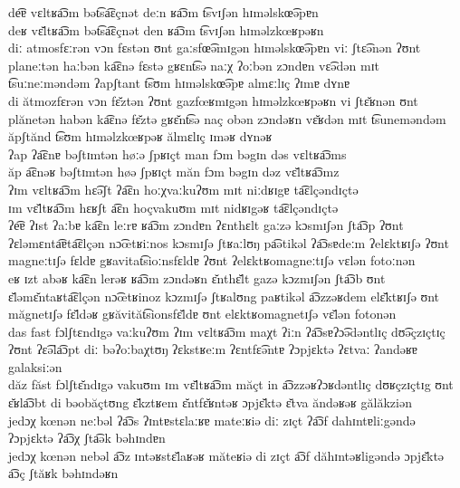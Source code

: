 \begin{exe}
  \ex \gll de͡ɐ vɛltʁa͡ɔm bət͡sa͡ɛçnət deːn ʁa͡ɔm t͡svɪʃən hɪməlskœ͡əpɐn\\
  deʁ vɛ̆ltʁa͡ɔm bət͡sa͡ɛçnət den ʁa͡ɔm t͡svɪʃən hɪməlzkœʁpəʁn\\
  \ex \gll diː atmosfɛːrən vɔn fɛstən ʊnt gaːsfœ͡əmɪgən hɪməlskœ͡əpɐn viː ʃtɛ͡ənən ʔʊnt planeːtən haːbən ka͡ɛnə fɛstə gʁɛnt͡sə naːχ ʔoːbən zɔndɐn vɛ͡ədən mɪt t͡suːneːməndəm ʔapʃtant t͡sʊm hɪməlskœ͡əpɐ almɛːlɪç ʔɪmɐ dʏnɐ\\
  di ătmozfɛrən vɔn fɛ̆ztən ʔʊnt gazfœʁmɪgən hɪməlzkœʁpəʁn vi ʃtɛ̆ʁnən ʊnt plănetən habən ka͡ɛnə fɛ̆ztə gʁɛ̆nt͡sə naç obən zɔndəʁn vɛ̆ʁdən mɪt t͡suneməndəm ăpʃtănd t͡sʊm hɪməlzkœʁpəʁ ălmɛlɪç ɪməʁ dʏnəʁ\\
  \ex \gll ʔap ʔa͡ɛnɐ bəʃtɪmtən høːə ʃpʁɪçt man fɔm bəgɪn dəs vɛltʁa͡ɔms\\
  ăp a͡ɛnəʁ bəʃtɪmtən høə ʃpʁɪçt măn fɔm bəgɪn dəz vɛ̆ltʁa͡ɔmz\\
  \ex \gll ʔɪm vɛltʁa͡ɔm hɛ͡əʃt ʔa͡ɛn hoːχvaːkuʔʊm mɪt niːdʁɪgɐ ta͡ɛlçəndɪçtə\\
  ɪm vɛ̆ltʁa͡ɔm hɛʁʃt a͡ɛn hoçvakuʊm mɪt nidʁɪgəʁ ta͡ɛlçəndɪçtə\\
  \ex \gll ʔe͡ɐ ʔɪst ʔaːbɐ ka͡ɛn leːrɐ ʁa͡ɔm zɔndɐn ʔɛnthɛlt gaːzə kɔsmɪʃən ʃta͡ɔp ʔʊnt ʔɛləmɛnta͡ɐta͡ɛlçən nɔ͡œtʁiːnos kɔsmɪʃə ʃtʁaːlʊŋ pa͡ətikəl ʔa͡ɔsɐdeːm ʔelɛktʁɪʃə ʔʊnt magneːtɪʃə fɛldɐ gʁavitat͡sioːnsfɛldɐ ʔʊnt ʔelɛktʁomagneːtɪʃə vɛlən fotoːnən\\
  eʁ ɪzt abəʁ ka͡ɛn lerəʁ ʁa͡ɔm zɔndəʁn ɛ̆nthɛ̆lt gazə kɔzmɪʃən ʃta͡ɔb ʊnt ɛ̆ləmɛ̆ntaʁta͡ɛlçən nɔ͡œtʁinoz kɔzmɪʃə ʃtʁalʊng paʁtikəl a͡ɔzzəʁdem elɛ̆ktʁɪʃə ʊnt măgnetɪʃə fɛ̆ldəʁ gʁăvităt͡sionsfɛ̆ldɐ ʊnt elɛktʁomagnetɪʃə vɛ̆lən fotonən\\
  \ex \gll das fast fɔlʃtɛndɪgə vaːkuʔʊm ʔɪm vɛltʁa͡ɔm maχt ʔiːn ʔa͡ɔsɐʔɔ͡ədəntlɪç dʊ͡əçzɪçtɪç ʔʊnt ʔɛ͡əla͡ɔpt diː bəʔoːbaχtʊŋ ʔɛkstʁeːm ʔɛntfɛ͡əntɐ ʔɔpjɛktə ʔɛtvaː ʔandəʁɐ galaksiːən\\
  dăz făst fɔlʃtɛ̆ndɪgə vakuʊm ɪm vɛ̆ltʁa͡ɔm măçt in a͡ɔzzəʁʔɔʁdəntlɪç dʊʁçzɪçtɪg ʊnt ɛ̆ʁla͡ɔbt di bəobăçtʊng ɛ̆kztʁem ɛ̆ntfɛ̆ʁntəʁ ɔpjɛ̆ktə ɛ̆tva ăndəʁəʁ gălăkziən\\
  \ex \gll jedɔχ kœnən neːbəl ʔa͡ɔs ʔɪntɐstɛlaːʁɐ mateːʁiə diː zɪçt ʔa͡ɔf dahɪntɐliːgəndə ʔɔpjɛktə ʔa͡ɔχ ʃta͡ək bəhɪndɐn\\
  jedɔχ kœnən nebəl a͡ɔz ɪntəʁstɛ̆laʁəʁ măteʁiə di zɪçt a͡ɔf dăhɪntəʁligəndə ɔpjɛ̆ktə a͡ɔç ʃtăʁk bəhɪndəʁn\\
\end{exe}

